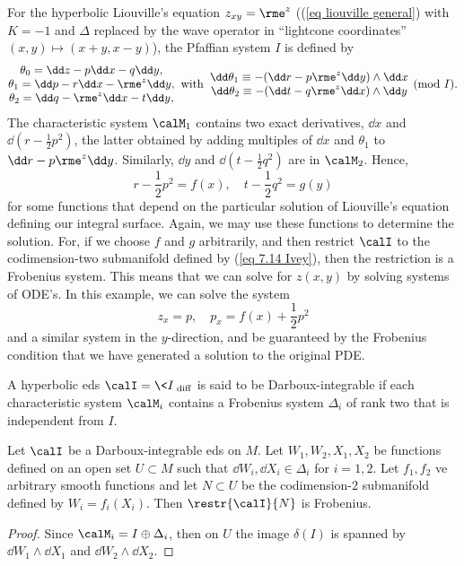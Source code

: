 \begin{example}\label{ex 7.3.6 Ivey}
    For the hyperbolic Liouville's equation $z_{xy}=\rme^z$ ((\ref{eq liouville general}) with $K=-1$ and $\Delta$ replaced by the wave operator in ``lightcone coordinates'' $(x,y)\mapsto (x+y,x-y)$), the Pfaffian system $I$ is defined by 
    \[
    \begin{matrix}
        \theta_0=\dd z-p\dd x-q\dd y,\\
        \theta_1=\dd p-r\dd x-\rme^z\dd y,\\
        \theta_2=\dd q-\rme^z\dd x-t\dd y,
    \end{matrix}    
    \;\;\text{with}\;\;
    \begin{matrix}
        \dd\theta_1\equiv -(\dd r-p\rme^z \dd y)\wedge \dd x\\
        \dd\theta_2\equiv -(\dd t-q\rme^z \dd x)\wedge \dd y
    \end{matrix}\pmod{I}.
    \]
    The characteristic system $\calM_1$ contains two exact derivatives, $\dd x$ and $\dd (r-\frac12 p^2)$, the latter obtained by adding multiples of $\dd x$ and $\theta_1$ to $\dd r-p\rme^z\dd y$. Similarly, $\dd y$ and $\dd(t-\frac12 q^2)$ are in $\calM_2$. Hence, 
    \[r-\frac12 p^2=f(x),\quad t-\frac12 q^2=g(y)\label{eq 7.14 Ivey}\]
    for some functions that depend on the particular solution of Liouville's equation defining our integral surface. Again, we may use these functions to determine the solution. For, if we choose $f$ and $g$ arbitrarily, and then restrict $\calI$ to the codimension-two submanifold defined by (\ref{eq 7.14 Ivey}), then the restriction is a Frobenius system. This means that we can solve for $z(x,y)$ by solving systems of ODE's. In this example, we can solve the system 
    \[z_x=p,\quad p_x=f(x)+\frac12 p^2\label{eq 7.15 Ivey}\]
    and a similar system in the $y$-direction, and be guaranteed by the Frobenius condition that we have generated a solution to the original PDE.
\end{example}

\begin{defn}
    A hyperbolic \gls{eds} $\calI=\<I\>_{\mathrm{diff}}$ is said to be Darboux-integrable if each characteristic system $\calM_i$ contains a Frobenius system $\Delta_i$ of rank two that is independent from $I$.
\end{defn}

\begin{prop}\label{prop 7.3.8 Ivey}
    Let $\calI$ be a Darboux-integrable \gls{eds} on $M$. Let $W_1,W_2,X_1,X_2$ be functions defined on an open set $U\subset M$ such that $\dd W_i,\dd X_i\in \Delta_i$ for $i=1,2$. Let $f_1,f_2$ ve arbitrary smooth functions and let $N\subset U$ be the codimension-$2$ submanifold defined by $W_i=f_i(X_i)$. Then $\restr{\calI}{N}$ is Frobenius.
\end{prop}
\begin{proof}
    Since $\calM_i=I\oplus\Delta_i$, then on $U$ the image $\delta(I)$ is spanned by $\dd W_1\wedge\dd X_1$ and $\dd W_2\wedge \dd X_2$.
\end{proof}


